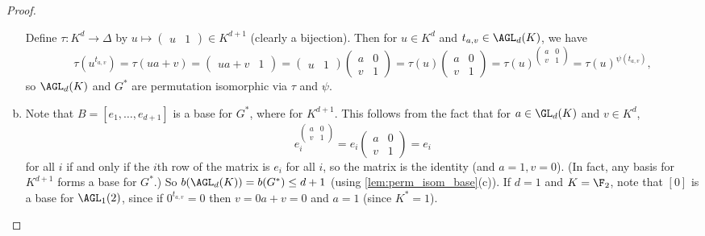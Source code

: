 \begin{proof}
\begin{enumerate}[(a)]
              Define $\tau : K^d \to \Delta$ by $u \mapsto
                  \begin{pmatrix}
                      u & 1
                  \end{pmatrix} \in K^{d+1}$ (clearly a bijection). Then for $u \in K^d$ and $t_{a,v} \in \AGL_d(K)$, we have
              $$\tau(u^{t_{a,v}}) = \tau(ua + v) =
                  \begin{pmatrix}
                      ua + v & 1
                  \end{pmatrix} =
                  \begin{pmatrix}
                      u & 1
                  \end{pmatrix}
                  \begin{pmatrix}
                      a & 0 \\
                      v & 1
                  \end{pmatrix} = \tau(u)
                  \begin{pmatrix}
                      a & 0 \\
                      v & 1
                  \end{pmatrix} = \tau(u)^{\left(
                      \begin{smallmatrix}
                          a & 0 \\
                          v & 1
                      \end{smallmatrix}\right)} = \tau(u)^{\psi(t_{a,v})},$$
              so $\AGL_d(K)$ and $G^*$ are permutation isomorphic via $\tau$ and $\psi$.
        \item Note that $B = [e_1,\dotsc,e_{d+1}]$ is a base for $G^*$, where  for $K^{d+1}$. This follows from the fact that for $a \in \GL_d(K)$ and $v \in K^d$,
              $$e_i^{\left(
                  \begin{smallmatrix}
                          a & 0 \\
                          v & 1
                      \end{smallmatrix}\right)} = e_i
                  \begin{pmatrix}
                      a & 0 \\
                      v & 1
                  \end{pmatrix} = e_i$$
              for all $i$ if and only if the $i$th row of the matrix is $e_i$ for all $i$, so the matrix is the identity (and $a = 1,v = 0$). (In fact, any basis for $K^{d+1}$ forms a base for $G^*$.) So $b(\AGL_d(K)) = b(G^*) \leq d + 1$ (using \autoref{lem:perm_isom_base}(c)). If $d = 1$ and $K = \F_2$, note that $[0]$ is a base for $\AGL_1(2)$, since if $0^{t_{a,v}} = 0$ then $v = 0a + v = 0$ and $a = 1$ (since $K^* = 1$).


\end{enumerate}
\end{proof}
